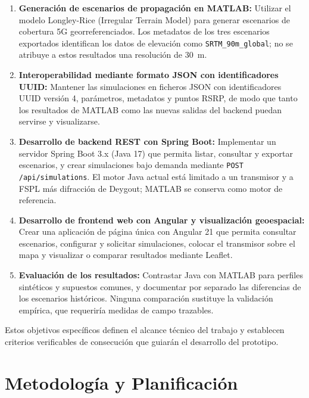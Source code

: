 \begin{enumerate}
    \item[\textbf{OE1.}] \textbf{Generación de escenarios de propagación en MATLAB:} Utilizar el modelo Longley-Rice (Irregular Terrain Model) para generar escenarios de cobertura 5G georreferenciados. Los metadatos de los tres escenarios exportados identifican los datos de elevación como \texttt{SRTM\_90m\_global}; no se atribuye a estos resultados una resolución de 30~m.
    
    \item[\textbf{OE2.}] \textbf{Interoperabilidad mediante formato JSON con identificadores UUID:} Mantener las simulaciones en ficheros JSON con identificadores UUID versión 4, parámetros, metadatos y puntos RSRP, de modo que tanto los resultados de MATLAB como las nuevas salidas del backend puedan servirse y visualizarse.
    
    \item[\textbf{OE3.}] \textbf{Desarrollo de backend REST con Spring Boot:} Implementar un servidor Spring Boot 3.x (Java 17) que permita listar, consultar y exportar escenarios, y crear simulaciones bajo demanda mediante \texttt{POST /api/simulations}. El motor Java actual está limitado a un transmisor y a FSPL más difracción de Deygout; MATLAB se conserva como motor de referencia.
    
    \item[\textbf{OE4.}] \textbf{Desarrollo de frontend web con Angular y visualización geoespacial:} Crear una aplicación de página única con Angular 21 que permita consultar escenarios, configurar y solicitar simulaciones, colocar el transmisor sobre el mapa y visualizar o comparar resultados mediante Leaflet.
    
    \item[\textbf{OE5.}] \textbf{Evaluación de los resultados:} Contrastar Java con MATLAB para perfiles sintéticos y supuestos comunes, y documentar por separado las diferencias de los escenarios históricos. Ninguna comparación sustituye la validación empírica, que requeriría medidas de campo trazables.
\end{enumerate}

Estos objetivos específicos definen el alcance técnico del trabajo y establecen criterios verificables de consecución que guiarán el desarrollo del prototipo.

\section{Metodología y Planificación}
\label{sec:metodologia}

